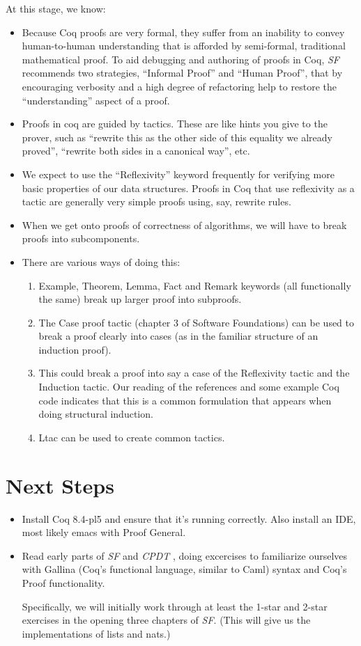 \documentclass{article}
\begin{document}
At this stage, we know:
\begin{itemize}
\item
  Because Coq proofs are very formal, they suffer from an inability to
  convey human-to-human understanding that is afforded by
  semi-formal, traditional mathematical proof.
  To aid debugging and authoring of proofs in Coq,
  \emph{SF} \cite{sf} recommends two strategies, ``Informal Proof''
  and ``Human Proof'', that by encouraging verbosity and a high degree
  of refactoring
  help to restore the ``understanding'' aspect of a proof.
\item Proofs in coq are guided by tactics. These are like hints you
  give to the prover, such as ``rewrite this as the other side of this
  equality we already proved'', ``rewrite both sides in a canonical
  way'',  etc.
\item We expect to use the ``Reflexivity'' keyword frequently for
  verifying more
  basic properties of our data structures.
  Proofs in Coq that use reflexivity as a tactic are generally very
  simple proofs using, say, rewrite rules.
\item When we get onto proofs of correctness of algorithms, we will
  have to break proofs into subcomponents.
\item There are various ways of doing this:
\begin{enumerate}
\item Example, Theorem, Lemma, Fact and Remark keywords (all
  functionally the same) break up larger proof into subproofs.
\item The Case proof tactic (chapter 3 of Software Foundations) can be
  used to break a proof clearly into cases (as in the familiar
  structure of an induction proof).
\item This could break a proof into say a case of the Reflexivity
  tactic and the Induction tactic.
  Our reading of the references and some example Coq code
  indicates that this is a common formulation that appears
  when doing structural induction.
\item Ltac can be used to create common tactics.
\end{enumerate}

\end{itemize}

\section{Next Steps}
\begin{itemize}
  \item
    Install Coq 8.4-pl5 and ensure that it's running correctly.
    Also install an IDE, most likely emacs with Proof General.
  \item
    Read early parts of \emph{SF} \cite{sf} and \emph{CPDT} \cite{cpdt},
    doing excercises to familiarize ourselves with Gallina (Coq's functional
    language, similar to Caml) syntax and Coq's Proof functionality.

    Specifically, we will initially work through at least the 1-star and
    2-star exercises in the opening three chapters of \emph{SF}.
    (This will give us the implementations of lists and nats.)
\end{itemize}
\end{document}
